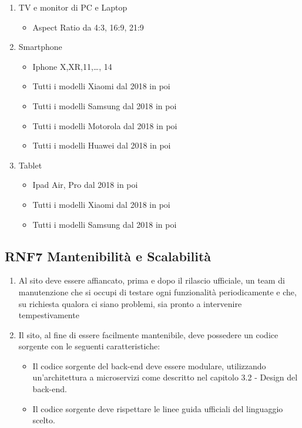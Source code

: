 \documentclass{report}
\begin{document}
\begin{enumerate}
	\item TV e monitor di PC e Laptop 
	\begin{itemize}
		\item Aspect Ratio da 4:3, 16:9, 21:9
	\end{itemize}
	\item Smartphone
	\begin{itemize}
		\item Iphone X,XR,11,\dots , 14
		\item Tutti i modelli Xiaomi dal 2018 in poi 
		\item Tutti i modelli Samsung dal 2018 in poi
		\item Tutti i modelli Motorola dal 2018 in poi 
		\item Tutti i modelli Huawei dal 2018 in poi 
	\end{itemize}
	\item Tablet 
	\begin{itemize}
		\item Ipad Air, Pro dal 2018 in poi
		\item Tutti i modelli Xiaomi dal 2018 in poi
		\item Tutti i modelli Samsung dal 2018 in poi
	\end{itemize}
\end{enumerate}
\subsection*{RNF7 Mantenibilità e Scalabilità}
\begin{enumerate}
	\item Al sito deve essere affiancato, prima e dopo il rilascio ufficiale, un team di manutenzione che si occupi di testare ogni funzionalità periodicamente e che, su richiesta qualora ci siano problemi, sia pronto a intervenire tempestivamente
	\item Il sito, al fine di essere facilmente mantenibile, deve possedere un codice sorgente con le seguenti caratteristiche:
	\begin{itemize}
		\item Il codice sorgente del back-end deve essere modulare, utilizzando un'architettura a microservizi come descritto nel capitolo 3.2 - Design del back-end.
		\item Il codice sorgente deve rispettare le linee guida ufficiali del linguaggio scelto.
	
	\end{itemize} 
\end{enumerate}
\end{document}
